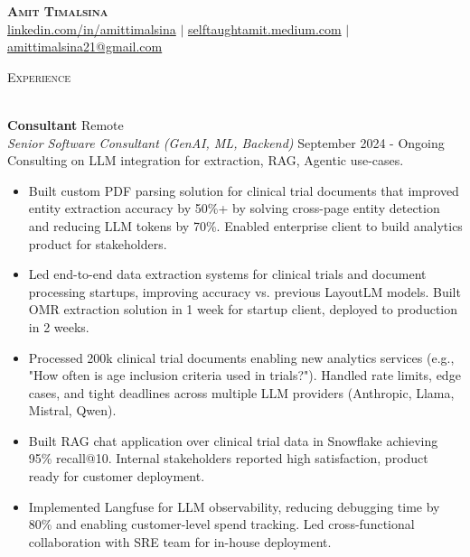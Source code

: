 \documentclass[a4paper]{article}
\newcommand{\lineunder} {
    \vspace*{-8pt} \\
    \hspace*{-18pt} \hrulefill \\
}
\newcommand{\header} [1] {
    {\hspace*{-18pt}\vspace*{6pt} \textsc{#1}}
    \vspace*{-6pt} \lineunder
}
\begin{document}
\vspace*{-40pt}

    

\vspace*{-10pt}
\begin{center}
	\textbf{\Huge \scshape {Amit Timalsina}} \\ \vspace{3pt}
    \small
    \href{https://www.linkedin.com/in/amittimalsina}{linkedin.com/in/amittimalsina}
    $|$
    \href{https://selftaughtamit.medium.com/}{selftaughtamit.medium.com}
    $|$
    \href{mailto:amittimlasina21@gmail.com}{amittimalsina21@gmail.com} \\
\end{center}

\header{Experience}
\vspace{1mm}

\textbf{Consultant} \hfill Remote\\
\textit{Senior Software Consultant (GenAI, ML, Backend)} \hfill September 2024 - Ongoing\\
{Consulting on LLM integration for extraction, RAG, Agentic use-cases.}
\vspace{-1mm}
\begin{itemize} \itemsep 0pt
	\item Built custom PDF parsing solution for clinical trial documents that improved entity extraction accuracy by 50\%+ by solving cross-page entity detection and reducing LLM tokens by 70\%. Enabled enterprise client to build analytics product for stakeholders.
	\item Led end-to-end data extraction systems for clinical trials and document processing startups, improving accuracy vs. previous LayoutLM models. Built OMR extraction solution in 1 week for startup client, deployed to production in 2 weeks.
	\item Processed 200k clinical trial documents enabling new analytics services (e.g., "How often is age inclusion criteria used in trials?"). Handled rate limits, edge cases, and tight deadlines across multiple LLM providers (Anthropic, Llama, Mistral, Qwen).
	\item Built RAG chat application over clinical trial data in Snowflake achieving 95\% recall@10. Internal stakeholders reported high satisfaction, product ready for customer deployment.
	\item Implemented Langfuse for LLM observability, reducing debugging time by 80\% and enabling customer-level spend tracking. Led cross-functional collaboration with SRE team for in-house deployment.
\end{itemize}
\end{document}

